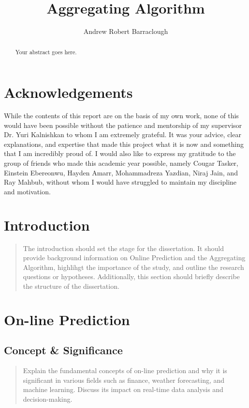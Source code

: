 \documentclass[11pt]{article} %
\title{Aggregating Algorithm}
\author{Andrew Robert Barraclough}
\theoremstyle{plain}
\theoremstyle{definition}
\begin{document}
\maketitle

\declaration

\begin{abstract}
  Your abstract goes here.
\end{abstract}

\section*{Acknowledgements}
While the contents of this report are on the basis of my own work, none of this would have been possible without the patience and mentorship of my supervisor Dr. Yuri Kalnishkan to whom I am extremely grateful. It was your advice, clear explanations, and expertise that made this project what it is now and something that I am incredibly proud of.
I would also like to express my gratitude to the group of friends who made this academic year possible, namely Cougar Tasker, Einstein Ebereonwu, Hayden Amarr, Mohammadreza Yazdian, Niraj Jain, and Ray Mahbub, without whom I would have struggled to maintain my discipline and motivation.
\newpage

\section{Introduction}
\begin{quote}
  The introduction should set the stage for the dissertation. It should provide background information on Online Prediction and the Aggregating Algorithm, highlihgt the importance of the study, and outline the research questions or hypotheses. Additionally, this section should briefly describe the structure of the dissertation.
\end{quote}

\newpage

\section{On-line Prediction}
\subsection{Concept \& Significance}
\begin{quote}
  Explain the fundamental concepts of on-line prediction and why it is significant in various fields such as finance, weather forecasting, and machine learning. Discuss its impact on real-time data analysis and decision-making.
\end{quote}
\end{document}
